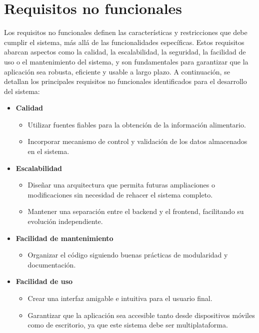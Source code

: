 \section{Requisitos no funcionales}
Los requisitos no funcionales definen las características y restricciones que debe cumplir el sistema, más allá de las funcionalidades específicas. Estos requisitos abarcan aspectos como la calidad, la escalabilidad, la seguridad, la facilidad de uso o el mantenimiento del sistema, y son fundamentales para garantizar que la aplicación sea robusta, eficiente y usable a largo plazo. A continuación, se detallan los principales requisitos no funcionales identificados para el desarrollo del sistema:
\begin{itemize}
    \item \textbf{Calidad}
    \begin{itemize}
        \item Utilizar fuentes fiables para la obtención de la información alimentario. 
        \item Incorporar mecanismo de control y validación de los datos almacenados en el sistema.
    \end{itemize}
    
    \item \textbf{Escalabilidad}
    \begin{itemize}
        \item Diseñar una arquitectura que permita  futuras ampliaciones o modificaciones sin necesidad de rehacer el sistema completo.
        \item Mantener una separación entre el backend y el frontend, facilitando su evolución independiente. 
    \end{itemize}
    
    \item \textbf{Facilidad de mantenimiento}
    \begin{itemize}
        \item Organizar el código siguiendo buenas prácticas de modularidad y documentación.
    \end{itemize}
    
    \item \textbf{Facilidad de uso}
    \begin{itemize}
        \item Crear una interfaz amigable e intuitiva para el usuario final.
        \item Garantizar que la aplicación sea accesible tanto desde dispositivos móviles como de escritorio, ya que este sistema debe ser multiplataforma.
    \end{itemize}
    

\end{itemize}
